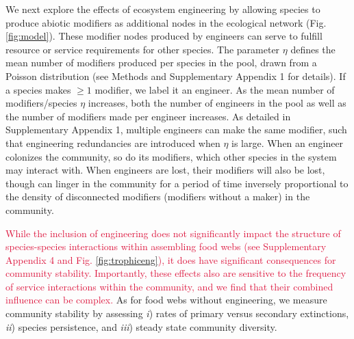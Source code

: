 \documentclass[twocolumn,preprintnumbers,amsmath,amssymb,superscriptaddress,linenumbers]{revtex4-1}
\newcommand{\rev}[1]{\textcolor{crimson}{#1}}
\begin{document}
We next explore the effects of ecosystem engineering by allowing species to produce abiotic modifiers as additional nodes in the ecological network (Fig. \ref{fig:model}).
These modifier nodes produced by engineers can serve to fulfill resource or service requirements for other species.
The parameter $\eta$ defines the mean number of modifiers produced per species in the pool, drawn from a Poisson distribution (see Methods and Supplementary Appendix 1 for details).
If a species makes $\geq 1$ modifier, we label it an engineer.
As the mean number of modifiers/species $\eta$ increases, both the number of engineers in the pool as well as the number of modifiers made per engineer increases.
As detailed in Supplementary Appendix 1, multiple engineers can make the same modifier, such that engineering redundancies are introduced when $\eta$ is large.
When an engineer colonizes the community, so do its modifiers, which other species in the system may interact with.
When engineers are lost, their modifiers will also be lost, though can linger in the community for a period of time inversely proportional to the density of disconnected modifiers (modifiers without a maker) in the community.






\rev{While the inclusion of engineering does not significantly impact the structure of species-species interactions within assembling food webs (see Supplementary Appendix 4 and Fig. \ref{fig:trophiceng}), it does have significant consequences for community stability.
Importantly, these effects also are sensitive to the frequency of service interactions within the community, and we find that their combined influence can be complex.}
As for food webs without engineering, we measure community stability by assessing
\emph{i}) rates of primary versus secondary extinctions,
\emph{ii}) species persistence, and 
\emph{iii}) steady state community diversity.
\end{document}
